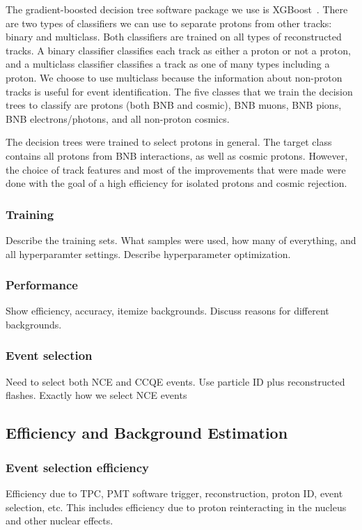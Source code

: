     The gradient-boosted decision tree software package we use is
    XGBoost~\cite{xgboost}. There are two types of classifiers we can use to
    separate protons from other tracks: binary and multiclass. Both classifiers
    are trained on all types of reconstructed tracks. A binary classifier
    classifies each track as either a proton or not a proton, and a multiclass
    classifier classifies a track as one of many types including a proton. We
    choose to use multiclass because the information about non-proton tracks is
    useful for event identification. The five classes that we train the
    decision trees to classify are protons (both BNB and cosmic), BNB muons,
    BNB pions, BNB electrons/photons, and all non-proton cosmics.
    
    The decision trees were trained to select protons in general. The target
    class contains all protons from BNB interactions, as well as cosmic
    protons. However, the choice of track features and most of the improvements
    that were made were done with the goal of a high efficiency for isolated
    protons and cosmic rejection.

  \subsubsection{Training}
    Describe the training sets. What samples were used, how many of everything,
    and all hyperparamter settings. Describe hyperparameter optimization. 
  \subsubsection{Performance}
    Show efficiency, accuracy, itemize backgrounds.
    Discuss reasons for different backgrounds.
  \subsubsection{Event selection}
    Need to select both NCE and CCQE events.
    Use particle ID plus reconstructed flashes.
    Exactly how we select NCE events 

\subsection{Efficiency and Background Estimation}\label{background}
  \subsubsection{Event selection efficiency}
    Efficiency due to TPC, PMT software trigger, reconstruction, proton ID,
    event selection, etc. This includes efficiency due to proton reinteracting
    in the nucleus and other nuclear effects.
